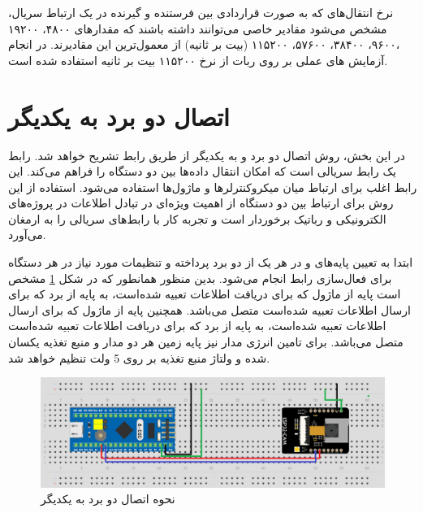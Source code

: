 نرخ انتقال‌های که به صورت قراردادی بین فرستنده و گیرنده در یک ارتباط سریال، مشخص می‌شود مقادیر خاصی می‌توانند داشته باشند که مقدارهای ۴۸۰۰، ۱۹۲۰۰ ،۹۶۰۰، ۳۸۴۰۰، ۵۷۶۰۰، ۱۱۵۲۰۰ (بیت بر ثانیه) از معمول‌ترین این مقادیرند. در انجام آزمایش های عملی بر روی ربات از نرخ ۱۱۵۲۰۰ بیت بر ثانیه استفاده شده است.


\section{اتصال دو برد به یکدیگر}


در این بخش، روش اتصال دو برد  و  به یکدیگر از طریق رابط  تشریح خواهد شد. رابط  یک رابط سریالی است که امکان انتقال داده‌ها بین دو دستگاه را فراهم می‌کند. این رابط اغلب برای ارتباط میان میکروکنترلرها و ماژول‌ها استفاده می‌شود. استفاده از این روش برای ارتباط بین دو دستگاه از اهمیت ویژه‌ای در تبادل اطلاعات در پروژه‌های الکترونیکی و رباتیک برخوردار است و تجربه کار با رابط‌های سریالی را به ارمغان می‌آورد.

ابتدا به تعیین پایه‌های  و  در هر یک از دو برد پرداخته و تنظیمات مورد نیاز در هر دستگاه برای فعال‌سازی رابط  انجام می‌شود. بدین منظور همانطور که در شکل 
\ref{اتصال دو برد}
مشخص است پایه
از ماژول
که برای دریافت اطلاعات تعبیه شده‌است، به پایه
از برد
که برای ارسال اطلاعات تعبیه شده‌است متصل می‌باشد. همچنین پایه
از ماژول
که برای ارسال اطلاعات تعبیه شده‌است، به پایه
از برد
که برای دریافت اطلاعات تعبیه شده‌است متصل می‌باشد. برای تامین انرژی مدار نیز پایه زمین هر دو مدار و منبع تغذیه یکسان شده و ولتاژ منبع تغذیه بر روی 5 ولت تنظیم خواهد شد.

\begin{figure}[H]
	\centering
	\includegraphics[width=1\textwidth]{./images/Chapter3/TwoBoardConnection}	
	\caption{نحوه اتصال دو برد  به یکدیگر}
	\label{اتصال دو برد}
\end{figure}



